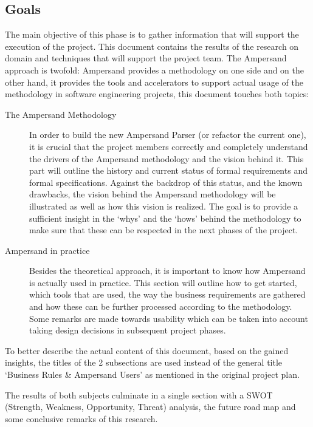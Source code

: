 \subsection{Goals}
The main objective of this phase is to gather information that will support the execution of the project.
This document contains the results of the research on domain and techniques that will support the project team.
The Ampersand approach is twofold: Ampersand provides a methodology on one side and on the other hand, it provides the tools and accelerators to support actual usage of the methodology in software engineering projects, this document touches both topics:
\begin{description}
	\item[The Ampersand Methodology]
	In order to build the new Ampersand Parser (or refactor the current one), it is crucial that the project members correctly and completely understand the drivers of the Ampersand methodology and the vision behind it.
	This part will outline the history and current status of formal requirements and formal specifications.
	 Against the backdrop of this status, and the known drawbacks, the vision behind the Ampersand methodology will be illustrated as well as how this vision is realized.
	The goal is to provide a sufficient insight in the `whys' and the `hows' behind the methodology to make sure that these can be respected in the next phases of the project.
	
	\item[Ampersand in practice]
	Besides the theoretical approach, it is important to know how Ampersand is actually used in practice. This section will outline how to get started, which tools that are used, the way the business requirements are gathered and how these can be further processed according to the methodology. Some remarks are made towards usability which can be taken into account taking design decisions in subsequent project phases.

\end{description}
To better describe the actual content of this document, based on the gained insights, the titles of the 2 subsections are used instead of the general title `Business Rules \& Ampersand Users' as mentioned in the original project plan.

The results of both subjects culminate in a single section with a SWOT (Strength, Weakness, Opportunity, Threat) analysis, the future road map and some conclusive remarks of this research.

